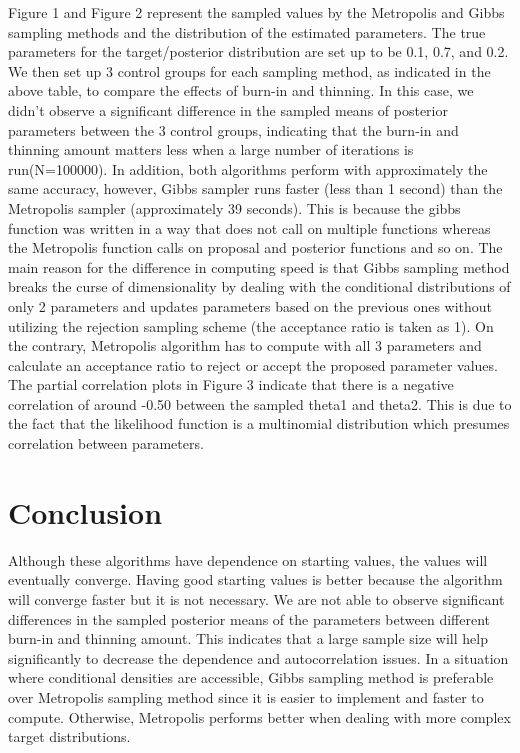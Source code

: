 \documentclass[11pt,a4paper]{article}
\begin{document}
 Figure 1 and Figure 2 represent the sampled values by the Metropolis and Gibbs sampling methods and the distribution of the estimated parameters. The true parameters for the target/posterior distribution are set up to be 0.1, 0.7, and 0.2. We then set up 3 control groups for each sampling method, as indicated in the above table, to compare the effects of burn-in and thinning. In this case, we didn’t observe a significant difference in the sampled means of posterior parameters between the 3 control groups, indicating that the burn-in and thinning amount matters less when a large number of iterations is run(N=100000). In addition, both algorithms perform with approximately the same accuracy, however, Gibbs sampler runs faster (less than 1 second) than the Metropolis sampler (approximately 39 seconds). This is because the gibbs function was written in a way that does not call on multiple functions whereas the Metropolis function calls on proposal and posterior functions and so on. The main reason for the difference in computing speed is that Gibbs sampling method breaks the curse of dimensionality by dealing with the conditional distributions of only 2 parameters and updates parameters based on the previous ones without utilizing the rejection sampling scheme (the acceptance ratio is taken as 1). On the contrary, Metropolis algorithm has to compute with all 3 parameters and calculate an acceptance ratio to reject or accept the proposed parameter values. \\

The partial correlation plots in Figure 3 indicate that there is a negative correlation of around -0.50 between the sampled theta1 and theta2. This is due to the fact that the likelihood function is a multinomial distribution which presumes correlation between parameters. 



\section*{Conclusion}
Although these algorithms have dependence on starting values, the values will eventually converge. Having good starting values is better because the algorithm will converge faster but it is not necessary. We are not able to observe significant differences in the sampled posterior means of the parameters between different burn-in and thinning amount. This indicates that a large sample size will help significantly to decrease the dependence and autocorrelation issues. In a situation where conditional densities are accessible, Gibbs sampling method is preferable over Metropolis sampling method since it is easier to implement and faster to compute. Otherwise, Metropolis performs better when dealing with more complex target distributions. 
	
\end{document}
